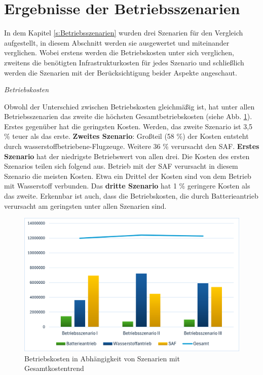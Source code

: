 \section{Ergebnisse der Betriebsszenarien}
In dem Kapitel \ref{s:Betriebsszenarien} wurden drei Szenarien für den Vergleich aufgestellt, in diesem Abschnitt werden sie ausgewertet und
miteinander verglichen. Wobei erstens werden die Betriebskosten unter sich verglichen, zweitens die benötigten Infrastrukturkosten für jedes Szenario
und schließlich werden die Szenarien mit der Berücksichtigung beider Aspekte angeschaut.

\textit{Betriebskosten}

Obwohl der Unterschied zwischen Betriebskosten gleichmäßig ist, hat unter allen Betriebsszenarien das zweite die höchsten Gesamtbetriebskosten (siehe Abb. \ref{res_betriebsszenarien}). 
Erstes gegenüber hat die geringsten Kosten. Werden, das zweite Szenario ist 3,5 \% teuer als das erste.
\textbf{Zweites Szenario}: Großteil (58 \%) der Kosten entsteht durch wasserstoffbetriebene-Flugzeuge. Weitere 36 \% verursacht den SAF.
\textbf{Erstes Szenario} hat der niedrigste Betriebswert von allen drei. Die Kosten des ersten Szenarios teilen sich folgend aus. 
Betrieb mit der SAF verursacht in diesem Szenario die meisten Kosten. Etwa ein Drittel
der Kosten sind von dem Betrieb mit Wasserstoff verbunden.
Das \textbf{dritte Szenario} hat 1 \% geringere Kosten als das zweite.
Erkennbar ist auch, dass die Betriebskosten, die durch Batterieantrieb verursacht am geringsten unter allen Szenarien sind.
\begin{figure}[h]
	\centering
	\includegraphics[width=0.8\linewidth]{Bilder/betriebssz_res.png}
	\caption[Betriebskosten in Abhängigkeit von Szenarien mit Gesamtkostentrend]{Betriebskosten in Abhängigkeit von Szenarien mit Gesamtkostentrend}
	\label{res_betriebsszenarien}
\end{figure}

